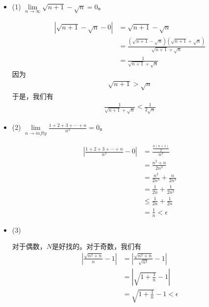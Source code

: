\documentclass{article}
\begin{document}
\begin{itemize}
  \item (1) $\lim\limits_{n \to \infty} \sqrt{n + 1} - \sqrt{n} = 0$。

        \begin{align*}
          |\sqrt{n + 1} - \sqrt{n} - 0|
           & = \sqrt{n + 1} - \sqrt{n}                                                            \\
           & = \frac{(\sqrt{n + 1} - \sqrt{n})(\sqrt{n + 1} + \sqrt{n})}{\sqrt{n + 1} + \sqrt{n}} \\
           & = \frac{1}{\sqrt{n + 1} + \sqrt{n}}
        \end{align*}
        因为
        \begin{align*}
          \sqrt{n + 1} > \sqrt{n}
        \end{align*}
        于是，我们有
        \begin{align*}
          \frac{1}{\sqrt{n + 1} + \sqrt{n}} < \frac{1}{2 \sqrt{n}}
        \end{align*}

  \item (2) $\lim\limits_{n \to infty} \frac{1 + 2 + 3 + \cdots + n}{n^3} = 0$。

        \begin{align*}
          |\frac{1 + 2 + 3 + \cdots + n}{n^3} - 0|
           & = \frac{\frac{n(n+1)}{2}}{n^3}      \\
           & = \frac{n^2 + n}{2n^3}              \\
           & = \frac{n^2}{2n^3} + \frac{n}{2n^3} \\
           & = \frac{1}{2n} + \frac{1}{2n^2}     \\
           & \leq \frac{1}{2n} + \frac{1}{2n}    \\
           & = \frac{1}{n} < \epsilon
        \end{align*}

  \item (3)

        对于偶数，$N$是好找的。对于奇数，我们有
        \begin{align*}
          |\frac{\sqrt{n^2 + n}}{n} - 1|
           & = |\frac{\sqrt{n^2 + n}}{\sqrt{n^2}} - 1| \\
           & = |\sqrt{1 + \frac{1}{n}} - 1|            \\
           & = \sqrt{1 + \frac{1}{n}} - 1 < \epsilon
        \end{align*}


\end{itemize}
\end{document}
